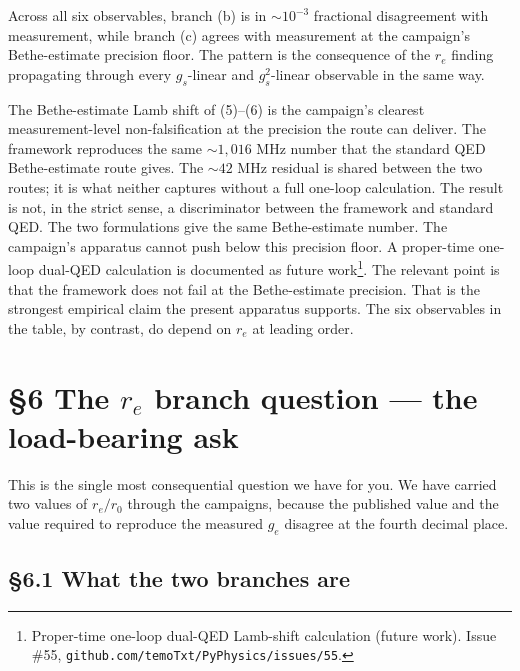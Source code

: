 \documentclass[
  11pt,
]{article}
\begin{document}
Across all six observables, branch (b) is in \(\sim 10^{-3}\) fractional
disagreement with measurement, while branch (c) agrees with measurement
at the campaign's Bethe-estimate precision floor. The pattern is the
consequence of the \(r_{e}\) finding propagating through every
\(g_{s}\)-linear and \(g_{s}^{2}\)-linear observable in the same way.

The Bethe-estimate Lamb shift of (5)--(6) is the campaign's clearest
measurement-level non-falsification at the precision the route can
deliver. The framework reproduces the same \(\sim 1{,}016\) MHz number
that the standard QED Bethe-estimate route gives. The \(\sim 42\) MHz
residual is shared between the two routes; it is what neither captures
without a full one-loop calculation. The result is not, in the strict
sense, a discriminator between the framework and standard QED. The two
formulations give the same Bethe-estimate number. The campaign's
apparatus cannot push below this precision floor. A proper-time one-loop
dual-QED calculation is documented as future work\footnote{Proper-time
  one-loop dual-QED Lamb-shift calculation (future work). Issue \#55,
  \texttt{github.com/temoTxt/PyPhysics/issues/55}.}. The relevant point
is that the framework does not fail at the Bethe-estimate precision.
That is the strongest empirical claim the present apparatus supports.
The six observables in the table, by contrast, do depend on \(r_{e}\) at
leading order.

\hypertarget{the-r_e-branch-question-the-load-bearing-ask}{%
\section{\texorpdfstring{§6 The \(r_{e}\) branch question --- the
load-bearing
ask}{§6 The r\_\{e\} branch question --- the load-bearing ask}}\label{the-r_e-branch-question-the-load-bearing-ask}}

This is the single most consequential question we have for you. We have
carried two values of \(r_{e}/r_{0}\) through the campaigns, because the
published value and the value required to reproduce the measured
\(g_{e}\) disagree at the fourth decimal place.

\hypertarget{what-the-two-branches-are}{%
\subsection{§6.1 What the two branches
are}\label{what-the-two-branches-are}}
\end{document}
